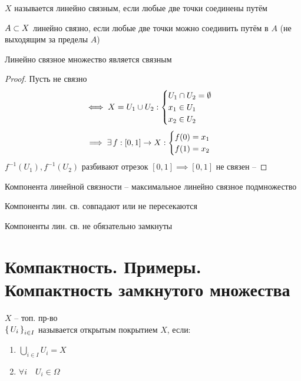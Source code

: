 \begin{definition}
	$ X $ называется линейно связным, если любые две точки соединены путём
\end{definition}

\begin{definition}
	$ A \subset X $ линейно связно, если любые две точки можно соединить путём в $ A $ (не выходящим за пределы $ A $)
\end{definition}

\begin{theorem}
	Линейно связное множество является связным
\end{theorem}

\begin{proof}
	Пусть не связно
	$$ \iff X = U_1 \cup U_2 :
	\begin{cases}
		U_1 \cap U_2 = \emptyset \\
		x_1 \in U_1 \\
		x_2 \in U_2
	\end{cases} $$
	$$ \implies \exists\, f : [0, 1] \to X :
	\begin{cases}
		f(0) = x_1 \\
		f(1) = x_2
	\end{cases} $$
	$ f^{-1}(U_1), f^{-1}(U_2) $ разбивают отрезок $ [0, 1] \implies [0, 1] $ не связен -- \contra
\end{proof}

\begin{definition}
	Компонента линейной связности -- максимальное линейно связное подмножество
\end{definition}

\begin{statement}
	Компоненты лин. св. совпадают или не пересекаются
\end{statement}

\begin{note}
	Компоненты лин. св. не обязательно замкнуты
\end{note}

\section{Компактность. Примеры. Компактность замкнутого множества}

\begin{definition}
	$ X $ -- топ. пр-во \\
	$ \set{U_i}_{i \in I} $ называется открытым покрытием $ X $, если:
	\begin{enumerate}
		\item $ \bigcup_{i \in I} U_i = X $
		\item $ \forall i \quad U_i \in \Omega $
	\end{enumerate}
\end{definition}

